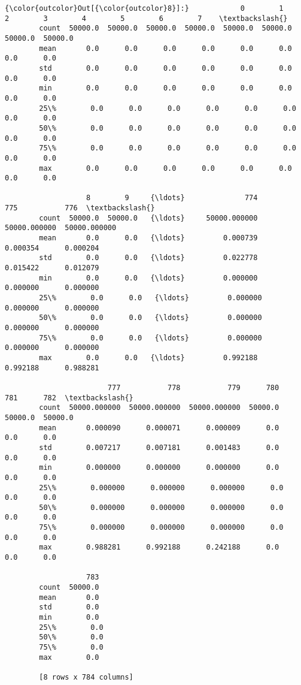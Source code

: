 \documentclass[11pt]{article}
\begin{document}
\begin{Verbatim}[commandchars=\\\{\}]
{\color{outcolor}Out[{\color{outcolor}8}]:}            0        1        2        3        4        5        6        7    \textbackslash{}
        count  50000.0  50000.0  50000.0  50000.0  50000.0  50000.0  50000.0  50000.0   
        mean       0.0      0.0      0.0      0.0      0.0      0.0      0.0      0.0   
        std        0.0      0.0      0.0      0.0      0.0      0.0      0.0      0.0   
        min        0.0      0.0      0.0      0.0      0.0      0.0      0.0      0.0   
        25\%        0.0      0.0      0.0      0.0      0.0      0.0      0.0      0.0   
        50\%        0.0      0.0      0.0      0.0      0.0      0.0      0.0      0.0   
        75\%        0.0      0.0      0.0      0.0      0.0      0.0      0.0      0.0   
        max        0.0      0.0      0.0      0.0      0.0      0.0      0.0      0.0   
        
                   8        9     {\ldots}              774           775           776  \textbackslash{}
        count  50000.0  50000.0   {\ldots}     50000.000000  50000.000000  50000.000000   
        mean       0.0      0.0   {\ldots}         0.000739      0.000354      0.000204   
        std        0.0      0.0   {\ldots}         0.022778      0.015422      0.012079   
        min        0.0      0.0   {\ldots}         0.000000      0.000000      0.000000   
        25\%        0.0      0.0   {\ldots}         0.000000      0.000000      0.000000   
        50\%        0.0      0.0   {\ldots}         0.000000      0.000000      0.000000   
        75\%        0.0      0.0   {\ldots}         0.000000      0.000000      0.000000   
        max        0.0      0.0   {\ldots}         0.992188      0.992188      0.988281   
        
                        777           778           779      780      781      782  \textbackslash{}
        count  50000.000000  50000.000000  50000.000000  50000.0  50000.0  50000.0   
        mean       0.000090      0.000071      0.000009      0.0      0.0      0.0   
        std        0.007217      0.007181      0.001483      0.0      0.0      0.0   
        min        0.000000      0.000000      0.000000      0.0      0.0      0.0   
        25\%        0.000000      0.000000      0.000000      0.0      0.0      0.0   
        50\%        0.000000      0.000000      0.000000      0.0      0.0      0.0   
        75\%        0.000000      0.000000      0.000000      0.0      0.0      0.0   
        max        0.988281      0.992188      0.242188      0.0      0.0      0.0   
        
                   783  
        count  50000.0  
        mean       0.0  
        std        0.0  
        min        0.0  
        25\%        0.0  
        50\%        0.0  
        75\%        0.0  
        max        0.0  
        
        [8 rows x 784 columns]
\end{Verbatim}
            
\end{document}
